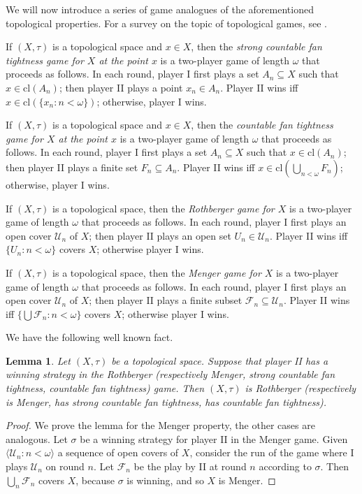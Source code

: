 \documentclass{amsart}
\newtheorem{lemma}[theorem]{Lemma}
\theoremstyle{definition}
\newcommand{\U}{\mathcal{U}}
\newcommand{\F}{\mathcal{F}}
\newcommand{\seq}[1]{{\langle{#1}\rangle}}
\renewcommand{\subset}{\subseteq}
\begin{document}
We will now introduce a series of game analogues of the aforementioned topological properties. For a survey on the topic of topological games, see \cite{telgarskyTopologicalGames50th1987}.

If $(X,\tau)$ is a topological space and $x\in X$, then the \emph{strong countable fan tightness game for $X$ at the point $x$} is a two-player game of length $\omega$ that proceeds as follows. In each round, player I first plays a set $A_n \subseteq X$ such that $x \in \mathrm{cl}(A_n)$; then player II plays a point $x_n \in A_n$. Player II wins iff $x \in \mathrm{cl}(\{x_n :n <\omega\})$; otherwise, player I wins.

If $(X,\tau)$ is a topological space and $x\in X$, then the \emph{countable fan tightness game for $X$ at the point $x$} is a two-player game of length $\omega$ that proceeds as follows. In each round, player I first plays a set $A_n \subseteq X$ such that $x \in \mathrm{cl}(A_n)$; then player II plays a finite set $F_n\subseteq A_n$. Player II wins iff $x \in \mathrm{cl}(\bigcup_{n<\omega} F_n)$; otherwise, player I wins.

If $(X,\tau)$ is a topological space, then the \emph{Rothberger game for $X$} is a two-player game of length $\omega$ that proceeds as follows. In each round, player I first plays an open cover $\mathcal{U}_n$ of $X$; then player II plays an open set $U_n\in \mathcal{U}_n$. Player II wins iff $\{U_n:n<\omega\}$ covers $X$; otherwise player I wins.

If $(X,\tau)$ is a topological space, then the \emph{Menger game for $X$} is a two-player game of length $\omega$ that proceeds as follows. In each round, player I first plays an open cover $\mathcal{U}_n$ of $X$; then player II plays a finite subset $\mathcal{F}_n \subset \mathcal{U}_n$. Player II wins iff $\{\bigcup \mathcal{F}_n:n<\omega\}$ covers $X$; otherwise player I wins.

We have the following well known fact.

\begin{lemma}\label{game}
Let $(X,\tau)$ be a topological space. Suppose that player II has a winning strategy in the Rothberger (respectively Menger, strong countable fan tightness, countable fan tightness) game. Then $(X,\tau)$ is Rothberger (respectively is Menger, has strong countable fan tightness, has countable fan tightness).
\end{lemma}

\begin{proof}
We prove the lemma for the Menger property, the other cases are analogous. Let $\sigma$ be a winning strategy for player II in the Menger game. Given $\seq{\U_n:n<\omega}$ a sequence of open covers of $X$, consider the run of the game where I plays $\U_n$ on round $n$. Let $\F_n$ be the play by II at round $n$ according to $\sigma$. Then $\bigcup_n\F_n$ covers $X$, because $\sigma$ is winning, and so $X$ is Menger.
\end{proof}
\end{document}
